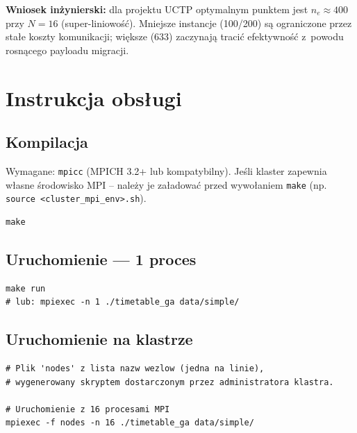 \documentclass{common/sprawozdanie-agh}
\begin{document}
\textbf{Wniosek inżynierski:} dla projektu UCTP optymalnym punktem jest $n_e \approx 400$ przy $N=16$ (super-liniowość). Mniejsze instancje (100/200) są ograniczone przez stałe koszty komunikacji; większe (633) zaczynają tracić efektywność z~powodu rosnącego payloadu migracji.

\section{Instrukcja obsługi}

\subsection{Kompilacja}

Wymagane: \texttt{mpicc} (MPICH 3.2+ lub kompatybilny). Jeśli klaster zapewnia własne środowisko MPI -- należy je załadować przed wywołaniem \texttt{make} (np. \texttt{source <cluster\_mpi\_env>.sh}).

\begin{lstlisting}[style=bashstyle]
make
\end{lstlisting}

\subsection{Uruchomienie --- 1 proces}

\begin{lstlisting}[style=bashstyle]
make run
# lub: mpiexec -n 1 ./timetable_ga data/simple/
\end{lstlisting}

\subsection{Uruchomienie na klastrze}

\begin{lstlisting}[style=bashstyle]
# Plik 'nodes' z lista nazw wezlow (jedna na linie),
# wygenerowany skryptem dostarczonym przez administratora klastra.

# Uruchomienie z 16 procesami MPI
mpiexec -f nodes -n 16 ./timetable_ga data/simple/
\end{lstlisting}
\end{document}
